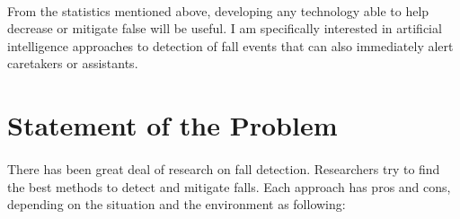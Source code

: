 \paragraph{}
From the statistics mentioned above, developing any technology able to help decrease or mitigate false will be useful. I am specifically interested in artificial intelligence approaches to detection of fall events that can also immediately alert caretakers or assistants.

\section{Statement of the Problem}
\paragraph{}
There has been great deal of research on fall detection. Researchers try to find the best methods to detect and mitigate falls. Each approach has pros and cons, depending on the situation and the environment as following:
